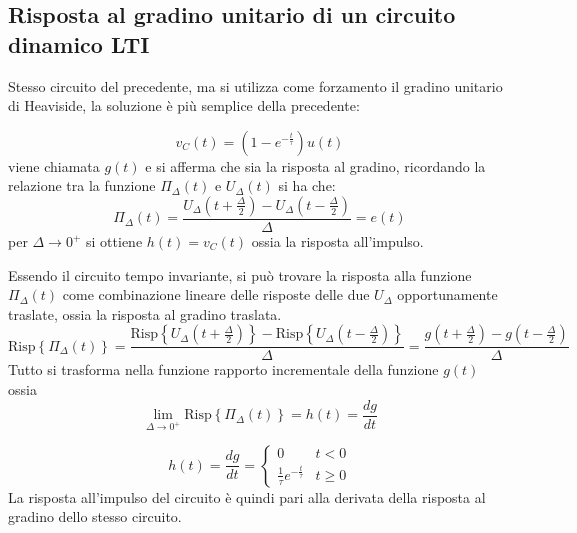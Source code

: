\newpage
\subsection{Risposta al gradino unitario di un circuito dinamico LTI}
Stesso circuito del precedente, ma si utilizza come forzamento il gradino unitario di
Heaviside, la soluzione è più semplice della precedente:

$$
v_C(t) = \left(1-e^{-\frac{t}{\tau}}\right) u(t)
$$
viene chiamata $g(t)$ e si afferma che sia la risposta al gradino, ricordando la relazione
tra la funzione $\Pi_\Delta(t)$ e $U_\Delta(t)$ si ha che:
$$
\Pi_\Delta(t) = \frac{U_\Delta\left(t+\frac{\Delta}{2}\right)-U_\Delta\left(t-\frac{\Delta}{2}\right)}{\Delta} = e(t)
$$
per $\Delta \rightarrow 0^+$ si ottiene $h(t) = v_C(t)$ ossia la risposta all'impulso.

Essendo il circuito tempo invariante, si può trovare la risposta alla funzione $\Pi_\Delta(t)$
come combinazione lineare delle risposte delle due $U_\Delta$ opportunamente traslate, ossia
la risposta al gradino traslata.
$$
\text{Risp}\left\{ \Pi_\Delta(t)\right\} = \frac{\text{Risp}\left\{U_\Delta\left(t+\frac{\Delta}{2}\right)\right\} - 
\text{Risp}\left\{U_\Delta\left(t-\frac{\Delta}{2}\right)\right\}}{\Delta} = 
\frac{g\left(t+\frac{\Delta}{2}\right) - g\left(t-\frac{\Delta}{2}\right)}{\Delta}
$$
Tutto si trasforma nella funzione rapporto incrementale della funzione $g(t)$ ossia
$$
\lim_{\Delta\rightarrow0^+}\text{Risp}\left\{\Pi_\Delta(t)\right\} = h(t) = \frac{dg}{dt}
$$

$$
h(t) = \frac{dg}{dt} =\begin{cases}
0& t < 0\\
\frac{1}{\tau}e^{-\frac{t}{\tau}} & t\geq0 
\end{cases}
$$
La risposta all'impulso del circuito è quindi pari alla derivata della risposta al gradino dello stesso
circuito.
